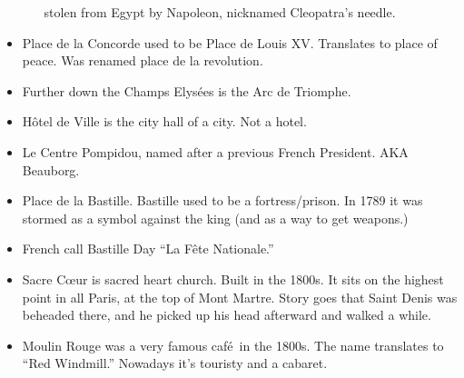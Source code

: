 \documentclass[11pt]{article}
\begin{document}
\begin{itemize}
\begin{itemize}
				stolen from Egypt by Napoleon, nicknamed Cleopatra's needle.  
		\end{itemize}
	\item Place de la Concorde used to be Place de Louis XV.  Translates to place
		of peace.  Was renamed place de la revolution.
	\item Further down the Champs Elys\'{e}es is the Arc de Triomphe.
	\item H\^{o}tel de Ville is the city hall of a city.  Not a hotel.
	\item Le Centre Pompidou, named after a previous French President.  AKA 
		Beauborg.
	\item Place de la Bastille.  Bastille used to be a fortress/prison.  In 1789
		it was stormed as a symbol against the king (and as a way to get weapons.)
	\item French call Bastille Day ``La F\^{e}te Nationale.''
	\item Sacre C\oe ur is sacred heart church.  Built in the 1800s.  It sits on 
		the highest point in all Paris, at the top of Mont Martre.  Story goes that 
		Saint Denis was beheaded there, and he picked up his head afterward and
		walked a while.
	\item Moulin Rouge was a very famous caf\'e\ in the 1800s.  The name 
		translates to ``Red Windmill.''  Nowadays it's touristy and a cabaret.
\end{itemize}
\end{document}
